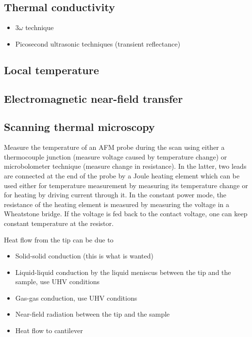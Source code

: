 \subsection{Thermal conductivity}

\begin{itemize}
 \item $3\omega$ technique
 \item Picosecond ultrasonic techniques (transient reflectance)
\end{itemize}

\subsection{Local temperature}

\subsection{Electromagnetic near-field transfer}

\subsection{Scanning thermal microscopy}

Measure the temperature of an AFM probe during the scan using either a thermocouple junction (measure voltage caused by temperature change) or microbolometer technique (measure change in resistance). In the latter, two leads are connected at the end of the probe by a Joule heating element which can be used either for temperature measurement by measuring its temperature change or for heating by driving current through it. In the constant power mode, the resistance of the heating element is measured by measuring the voltage in a Wheatstone bridge. If the voltage is fed back to the contact voltage, one can keep constant temperature at the resistor. 

Heat flow from the tip can be due to
\begin{itemize}
 \item Solid-solid conduction (this is what is wanted)
 \item Liquid-liquid conduction by the liquid meniscus between the tip and the sample, use UHV conditions
 \item Gas-gas conduction, use UHV conditions
 \item Near-field radiation between the tip and the sample
 \item Heat flow to cantilever
\end{itemize}

